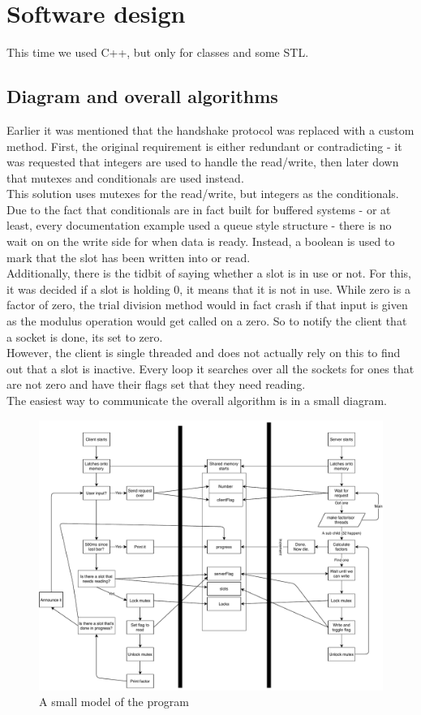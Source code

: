 \documentclass{article}
\newcommand\tab[1][1cm]{\hspace*{#1}}
\begin{document}
    \section{Software design}
    This time we used C++, but only for classes and some STL.
    \subsection*{Diagram and overall algorithms}
    Earlier it was mentioned that the handshake protocol was replaced with a
    custom method.
    First, the original requirement is either redundant or contradicting -
    it was requested that integers are used to handle the read/write, then later
    down that mutexes and conditionals are used instead.  \\
    \tab
    This solution uses mutexes for the read/write, but integers as the conditionals.
    Due to the fact that conditionals are in fact built for buffered systems - or at
    least, every documentation example used a queue style structure - there
    is no wait on on the write side for when data is ready.
    Instead, a boolean is used to mark that the slot has been written into
    or read.
    \\ \tab Additionally, there is the tidbit of saying whether a slot is in use
    or not.
    For this, it was decided if a slot is holding 0, it means that it is not
    in use.
    While zero is a factor of zero, the trial division method would in fact crash if
    that input is given as the modulus operation would get called on a zero.
    So to notify the client that a socket is done, its set to zero.
    \\ \tab However, the client is single threaded and does not actually rely on this
    to find out that a slot is inactive.
    Every loop it searches over all the sockets for ones that are not zero and have
    their flags set that they need reading.
    \\ \tab The easiest way to communicate the overall algorithm is in a small diagram.
    \begin{figure}[ht!]
        \centering
        \includegraphics[scale=0.6]{figures/sharedMemoryModel.pdf}
        \caption{A small model of the program}
        \label{fig:sharedMemoryModel}
    \end{figure}
\end{document}
